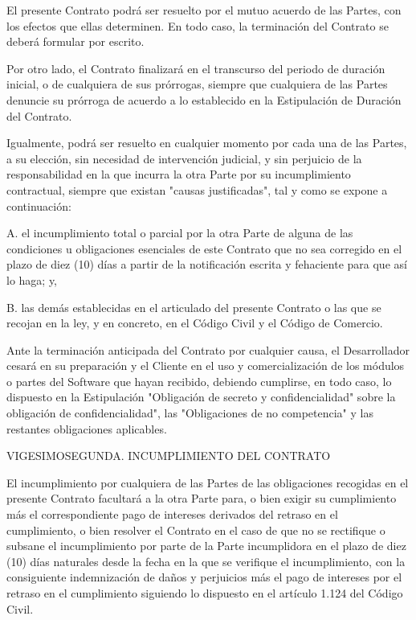 \documentclass[a4paper,11pt]{report}
\begin{document}
El presente Contrato podrá ser resuelto por el mutuo acuerdo de las
Partes, con los efectos que ellas determinen. En todo caso, la
terminación del Contrato se deberá formular por escrito.

Por otro lado, el Contrato finalizará en el transcurso del periodo de
duración inicial, o de cualquiera de sus prórrogas, siempre que
cualquiera de las Partes denuncie su prórroga de acuerdo a lo
establecido en la Estipulación de Duración del Contrato.

Igualmente, podrá ser resuelto en cualquier momento por cada una de las
Partes, a su elección, sin necesidad de intervención judicial, y sin
perjuicio de la responsabilidad en la que incurra la otra Parte por su
incumplimiento contractual, siempre que existan "causas justificadas",
tal y como se expone a continuación:

A. el incumplimiento total o parcial por la otra Parte de alguna de las
condiciones u obligaciones esenciales de este Contrato que no sea
corregido en el plazo de diez (10) días a partir de la notificación
escrita y fehaciente para que así lo haga; y,

B. las demás establecidas en el articulado del presente Contrato o las
que se recojan en la ley, y en concreto, en el Código Civil y el Código
de Comercio.

Ante la terminación anticipada del Contrato por cualquier causa, el
Desarrollador cesará en su preparación y el Cliente en el uso y
comercialización de los módulos o partes del Software que hayan
recibido, debiendo cumplirse, en todo caso, lo dispuesto en la
Estipulación "Obligación de secreto y confidencialidad" sobre la
obligación de confidencialidad", las "Obligaciones de no competencia" y
las restantes obligaciones aplicables.

VIGESIMOSEGUNDA. INCUMPLIMIENTO DEL CONTRATO

El incumplimiento por cualquiera de las Partes de las obligaciones
recogidas en el presente Contrato facultará a la otra Parte para, o bien
exigir su cumplimiento más el correspondiente pago de intereses
derivados del retraso en el cumplimiento, o bien resolver el Contrato en
el caso de que no se rectifique o subsane el incumplimiento por parte de
la Parte incumplidora en el plazo de diez (10) días naturales desde la
fecha en la que se verifique el incumplimiento, con la consiguiente
indemnización de daños y perjuicios más el pago de intereses por el
retraso en el cumplimiento siguiendo lo dispuesto en el artículo 1.124
del Código Civil.
\end{document}
